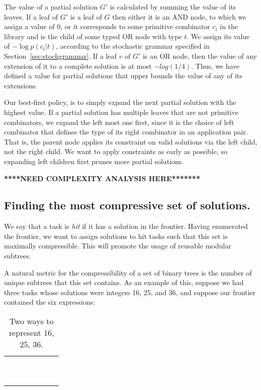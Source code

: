 \documentclass{article}
\begin{document}
The value of a partial solution $G'$ is calculated by summing the
value of its leaves. If a leaf of $G'$ is a leaf of $G$ then either it
is an AND node, to which we assign a value of 0, or it corresponds to
some primitive combinator $c_i$ in the library and is the child of
some typed OR node with type $t$. We assign its value of $- \log{p(c_i
  | t)}$, according to the stochastic grammar specified in
Section~\ref{sec:stochgrammar}. If a leaf $v$ of $G'$ is an OR node,
then the value of any extension of it to a complete solution is at
most $-log(1/4)$. Thus, we have defined a value for partial solutions
that upper bounds the value of any of its extensions. 

Our best-first policy, is to simply expand the next partial solution
with the highest value. If a partial solution has multiple leaves that
are not primitive combinators, we expand the left most one first,
since it is the choice of left combinator that defines the type of its
right combinator in an application pair. That is, the parent node
applies its constraint on valid solutions via the left child, not the
right child. We want to apply constraints as early as possible, so
expanding left children first prunes more partial solutions.

\textbf{****NEED COMPLEXITY ANALYSIS HERE*******}

\subsection{Finding the most compressive set of solutions.}

We say that a task is \emph{hit} if it has a solution in the
frontier. Having enumerated the frontier, we want to assign solutions
to hit tasks such that this set is maximally compressible. This will
promote the usage of reusable modular subtrees. 

A natural metric for the compressibility of a set of binary trees is
the number of unique subtrees that this set contains. As an example of
this, suppose we had three tasks whose solutions were integers 16, 25,
and 36, and suppose our frontier contained the six expressions:

\begin{table}[h]
  \begin{tabular}{|l|l|l|}
    ~ & ~ & ~ \\ 
    ~ & ~ & ~ 
    \end{tabular}
  \caption{Two ways to represent 16, 25, 36.}
  \label{table:compress}
\end{table}
\end{document}
